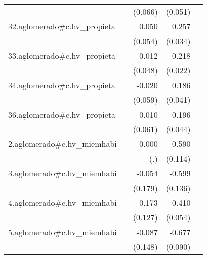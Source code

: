 {\begin{longtable}{l*{4}{D{.}{.}{-1}}}
            &                     &     (0.066)         &     (0.051)         &                     \\
\addlinespace
32.aglomerado#c.hv\_propieta&                     &       0.050         &       0.257\sym{***}&                     \\
            &                     &     (0.054)         &     (0.034)         &                     \\
\addlinespace
33.aglomerado#c.hv\_propieta&                     &       0.012         &       0.218\sym{***}&                     \\
            &                     &     (0.048)         &     (0.022)         &                     \\
\addlinespace
34.aglomerado#c.hv\_propieta&                     &      -0.020         &       0.186\sym{***}&                     \\
            &                     &     (0.059)         &     (0.041)         &                     \\
\addlinespace
36.aglomerado#c.hv\_propieta&                     &      -0.010         &       0.196\sym{***}&                     \\
            &                     &     (0.061)         &     (0.044)         &                     \\
\addlinespace
2.aglomerado#c.hv\_miemhabi&                     &       0.000         &      -0.590\sym{***}&                     \\
            &                     &         (.)         &     (0.114)         &                     \\
\addlinespace
3.aglomerado#c.hv\_miemhabi&                     &      -0.054         &      -0.599\sym{***}&                     \\
            &                     &     (0.179)         &     (0.136)         &                     \\
\addlinespace
4.aglomerado#c.hv\_miemhabi&                     &       0.173         &      -0.410\sym{***}&                     \\
            &                     &     (0.127)         &     (0.054)         &                     \\
\addlinespace
5.aglomerado#c.hv\_miemhabi&                     &      -0.087         &      -0.677\sym{***}&                     \\
            &                     &     (0.148)         &     (0.090)         &                     \\

\end{longtable}}
